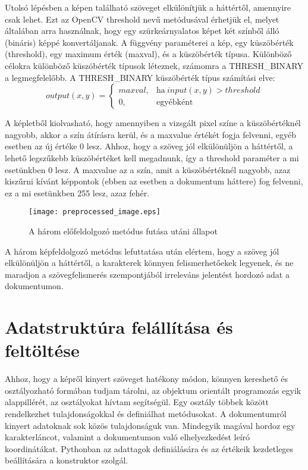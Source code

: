 \documentclass[12pt]{report}
\begin{document}
Utolsó lépésben a képen található szöveget elkülönítjük a háttértől, amennyire csak lehet. Ezt az OpenCV threshold nevű metódusával érhetjük el, melyet általában arra használnak, hogy egy szürkeárnyalatos képet két színből álló (bináris) képpé konvertáljanak. A függvény paraméterei a kép, egy küszöbérték (threshold), egy maximum érték (maxval), és a küszöbérték típusa.
Különböző célokra különböző küszöbérték típusok léteznek, számomra a THRESH\_BINARY a legmegfelelőbb.
A THRESH\_BINARY küszöbérték típus számítási elve:
\begin{equation*}
output(x,y)=
    \begin{cases}
        maxval, & \text{ha}\ input(x,y)>threshold \\
        0, & \text{egyébként}
    \end{cases}
\end{equation*}

A képletből kiolvasható, hogy amennyiben a vizsgált pixel színe a küszöbértéknél nagyobb, akkor a szín átírásra kerül, és a maxvalue értékét fogja felvenni, egyéb esetben az új értéke 0 lesz.
Ahhoz, hogy a szöveg jól elkülönüljön a háttértől, a lehető legszűkebb küszöbértéket kell megadnunk, így a threshold paraméter a mi esetünkben 0 lesz. A maxvalue az a szín, amit a küszöbértéknél nagyobb, azaz kiszűrni kívánt képpontok (ebben az esetben a dokumentum háttere) fog felvenni, ez a mi esetünkben 255 lesz, azaz fehér.

\begin{figure}[h]
    \centerline{\texttt{[image: preprocessed\_image.eps]}}
    \caption{A három előfeldolgozó metódus futása utáni állapot}
\end{figure}

A három képfeldolgozó metódus lefuttatása után elértem, hogy a szöveg jól elkülönüljön a háttértől, a karakterek könnyen felismerhetőekek legyenek, és ne maradjon a szövegfelismerés szempontjából irreleváns jelentést hordozó adat a dokumentumon.

\section{Adatstruktúra felállítása és feltöltése}

Ahhoz, hogy a képről kinyert szöveget hatékony módon, könnyen kereshető és osztályozható formában tudjam tárolni, az objektum orientált programozás egyik alappillérét, az osztályokat hívtam segítségül. Egy osztály többek között rendelkezhet tulajdonságokkal és definiálhat metódusokat. A dokumentumról kinyert adatoknak sok közös tulajdonságuk van. Mindegyik magával hordoz egy karakterláncot, valamint a dokumentumon való elhelyezkedést leíró koordinátákat. Pythonban az adattagok definiálására és az értékeik kezdetleges beállítására a konstruktor szolgál.
\end{document}
